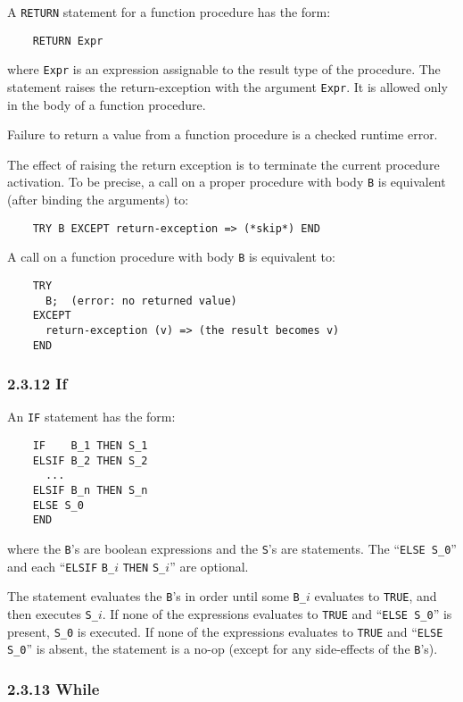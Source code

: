 \documentclass[10pt]{article}
\begin{document}
A \verb|RETURN| statement for a function procedure has the form:
\begin{verbatim}
    RETURN Expr
\end{verbatim}
where \verb|Expr| is an expression assignable to the result type of the
procedure.  The statement raises the return-exception with the argument
\verb|Expr|.  It is allowed only in the body of a function procedure.

Failure to return a value from a function procedure is a checked runtime
error.

The effect of raising the return exception is to terminate the current
procedure activation.  To be precise, a call on a proper procedure with body
\verb|B| is equivalent (after binding the arguments) to:
\begin{verbatim}
    TRY B EXCEPT return-exception => (*skip*) END
\end{verbatim}
A call on a function procedure with body \verb|B| is equivalent to:
\begin{verbatim}
    TRY
      B;  (error: no returned value)
    EXCEPT
      return-exception (v) => (the result becomes v)
    END
\end{verbatim}

\subsubsection*{2.3.12 If}

An \verb|IF| statement has the form:
\begin{verbatim}
    IF    B_1 THEN S_1
    ELSIF B_2 THEN S_2
      ...
    ELSIF B_n THEN S_n
    ELSE S_0
    END
\end{verbatim}
where the \verb|B|'s are boolean expressions and the \verb|S|'s are
statements.  The ``\verb|ELSE S_0|'' and each ``\verb|ELSIF| \verb|B_|$i$
\verb|THEN| \verb|S_|$i$'' are optional.

The statement evaluates the \verb|B|'s in order until some \verb|B_|$i$
evaluates to \verb|TRUE|, and then executes \verb|S_|$i$.  If none of the
expressions evaluates to \verb|TRUE| and ``\verb|ELSE S_0|'' is present,
\verb|S_0| is executed.  If none of the expressions evaluates to \verb|TRUE|
and ``\verb|ELSE S_0|'' is absent, the statement is a no-op (except for any
side-effects of the \verb|B|'s).

\subsubsection*{2.3.13 While}
\end{document}
